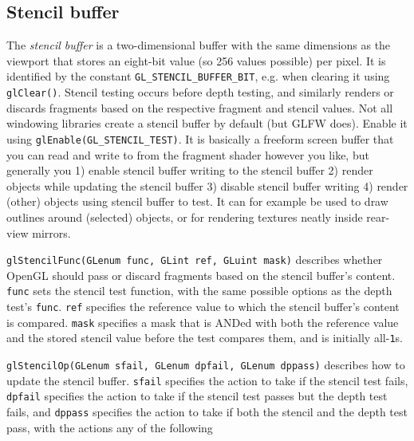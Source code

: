 \documentclass[table, xcdraw]{article}%
\begin{document}
\subsection{Stencil buffer}

The \emph{stencil buffer} is a two-dimensional buffer with the same dimensions as the viewport that stores an eight-bit value (so 256 values possible) per pixel. It is identified by the constant \texttt{GL_STENCIL_BUFFER_BIT}, e.g. when clearing it using \texttt{glClear()}. Stencil testing occurs before depth testing, and similarly renders or discards fragments based on the respective fragment and stencil values. Not all windowing libraries create a stencil buffer by default (but GLFW does). Enable it using \texttt{glEnable(GL_STENCIL_TEST)}. It is basically a freeform screen buffer that you can read and write to from the fragment shader however you like, but generally you 1) enable stencil buffer writing to the stencil buffer 2) render objects while updating the stencil buffer 3) disable stencil buffer writing 4) render (other) objects using stencil buffer to test. It can for example be used to draw outlines around (selected) objects, or for rendering textures neatly inside rear-view mirrors.

\texttt{glStencilFunc(GLenum func, GLint ref, GLuint mask)} describes whether OpenGL should pass or discard fragments based on the stencil buffer's content. \texttt{func} sets the stencil test function, with the same possible options as the depth test's \texttt{func}. \texttt{ref} specifies the reference value to which the stencil buffer's content is compared. \texttt{mask} specifies a mask that is ANDed with both the reference value and the stored stencil value before the test compares them, and is initially all-\texttt{1}s.


\texttt{glStencilOp(GLenum sfail, GLenum dpfail, GLenum dppass)} describes how to update the stencil buffer. \texttt{sfail} specifies the action to take if the stencil test fails, \texttt{dpfail} specifies the action to take if the stencil test passes but the depth test fails, and \texttt{dppass} specifies the action to take if both the stencil and the depth test pass, with the actions any of the following
\end{document}
